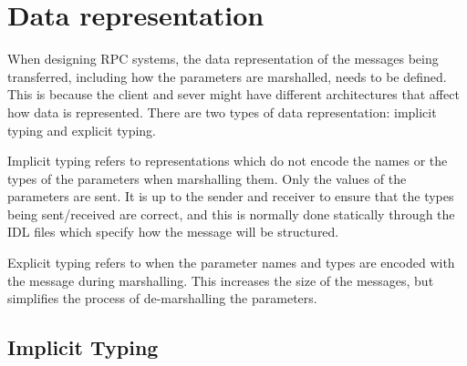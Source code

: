 \section{Data representation}


When designing RPC systems, the data representation of the messages being transferred, including how the parameters are marshalled, needs to be defined. This is because the client and sever might have different architectures that affect how data is represented. There are two types of data representation: implicit typing and explicit typing.

Implicit typing refers to representations which do not encode the names or the types of the parameters when marshalling them. Only the values of the parameters are sent. It is up to the sender and receiver to ensure that the types being sent/received are correct, and this is normally done statically through the IDL files which specify how the message will be structured. 

Explicit typing refers to when the parameter names and types are encoded with the message during marshalling. This increases the size of the messages, but simplifies the process of de-marshalling the parameters.


\subsection{Implicit Typing}


